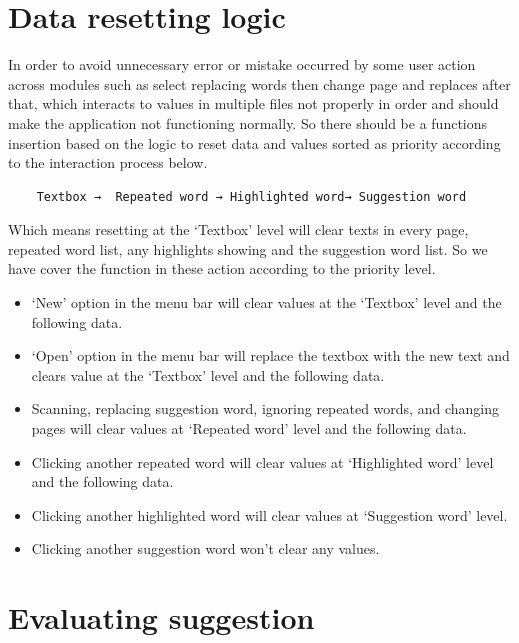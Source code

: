 \documentclass[12pt,oneside,openright,a4paper]{cpe-english-project}
\begin{document}
\section{Data resetting logic}
In order to avoid unnecessary error or mistake occurred by some user action across modules such as select replacing words then change page and replaces after that, which interacts to values in multiple files not properly in order and should make the application not functioning normally. So there should be a functions insertion based on the logic to reset data and values sorted as priority according to the interaction process below. 
\begin{verbatim}
	Textbox →  Repeated word → Highlighted word→ Suggestion word
\end{verbatim}
Which means resetting at the ‘Textbox’ level will clear texts in every page, repeated word list, any highlights showing and the suggestion word list. So we have cover the function in these action according to the priority level.

\begin{itemize}
\item ‘New’ option in the menu bar will clear values at the ‘Textbox’ level and the following data.
\item ‘Open’ option in the menu bar will replace the textbox with the new text and clears value at the ‘Textbox’ level and the following data.
\item Scanning, replacing suggestion word, ignoring repeated words, and changing pages will clear values at ‘Repeated word’ level and the following data.
\item Clicking another repeated word will clear values at ‘Highlighted word’ level and the following data.
\item Clicking another highlighted word will clear values at ‘Suggestion word’ level.
\item Clicking another suggestion word won’t clear any values.
\end{itemize}

\section {Evaluating suggestion}
\end{document}
